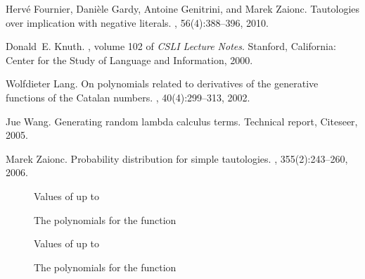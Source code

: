 \documentclass[preprint,authoryear]{elsarticle}
\begin{document}
\begin{thebibliography}{10}
Herv{\'e} Fournier, Dani{\`e}le Gardy, Antoine Genitrini, and Marek Zaionc.
\newblock Tautologies over implication with negative literals.
, 56(4):388--396, 2010.

Donald~E. Knuth.
, volume 102 of {\em
  CSLI Lecture Notes}.
\newblock Stanford, California: Center for the Study of Language and
  Information, 2000.

Wolfdieter Lang.
\newblock On polynomials related to derivatives of the generative functions of
  the {Catalan} numbers.
, 40(4):299--313, 2002.

Jue Wang.
\newblock Generating random lambda calculus terms.
\newblock Technical report, Citeseer, 2005.

Marek Zaionc.
\newblock Probability distribution for simple tautologies.
, 355(2):243--260, 2006.

\end{thebibliography}

\begin{landscape}
  \begin{figure}[tb]
    \begin{center}
      
      \caption{Values of  up to }\label{fig:T}
    \end{center} 
\end{figure}
\end{landscape}

\begin{landscape}
  \begin{figure}[h]
    \centering
   
    \caption{The polynomials  for the function }\label{fig:Pn}
    \label{fig:poly}
  \end{figure}
\end{landscape}

\begin{landscape}
  \begin{figure}
    \centering
    
\caption{Values of  up to }
    \label{fig:F}
  \end{figure}
\end{landscape}

\begin{landscape}
  \begin{figure}[h]
    \centering
   
    \caption{The polynomials  for the function }\label{fig:PFn}
    \label{fig:polyF}
  \end{figure}
\end{landscape}
\end{document}
